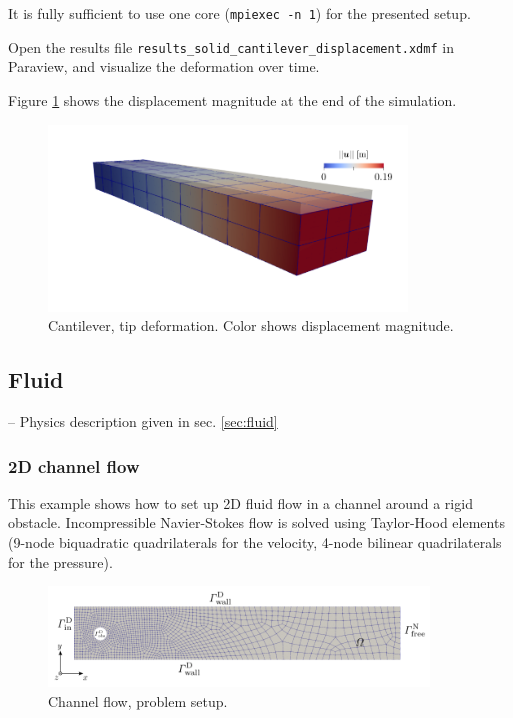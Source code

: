 \documentclass[a4paper,12pt]{report}
\begin{document}
It is fully sufficient to use one core (\verb"mpiexec -n 1") for the presented setup.

Open the results file \verb"results_solid_cantilever_displacement.xdmf" in Paraview, and visualize the deformation over time.

Figure \ref{fig:cantilever_results} shows the displacement magnitude at the end of the simulation.

\begin{figure}
\centering
\includegraphics[width=0.85\textwidth]{fig/cantilever_results.png}
\caption{Cantilever, tip deformation. Color shows displacement magnitude.}
\label{fig:cantilever_results}
\end{figure}


\subsection{Fluid}\label{subsec:demos:fluid}

-- Physics description given in sec. \ref{sec:fluid}

\subsubsection*{2D channel flow}

This example shows how to set up 2D fluid flow in a channel around a rigid obstacle. Incompressible Navier-Stokes flow is solved using Taylor-Hood elements
(9-node biquadratic quadrilaterals for the velocity, 4-node bilinear quadrilaterals for the pressure).

\begin{figure}
\centering
\includegraphics[width=0.9\textwidth]{fig/channel_setup.png}
\caption{Channel flow, problem setup.}
\label{fig:channel_setup}
\end{figure}
\end{document}
